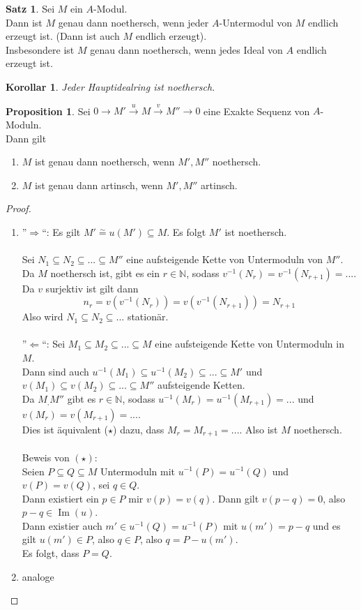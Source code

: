 \documentclass[10pt,a4paper]{article}
\newcommand{\N}{\ensuremath{\mathbb{N}}}
\newcommand{\Img}{\ensuremath{\operatorname{Im}}}
\newcommand{\isomorph}{\ensuremath{\overset{\sim}{=}}}
\newcounter{thm}[section]
\theoremstyle{definition}
\newtheorem{satz}[thm]{Satz}
\newtheorem{prop}[thm]{Proposition}
\theoremstyle{plain}
\newtheorem{kor}[thm]{Korollar}
\theoremstyle{remark}
\begin{document}
\begin{satz}
	Sei $M$ ein $A$-Modul.\\
	Dann ist $M$ genau dann noethersch, wenn jeder $A$-Untermodul von $M$ endlich erzeugt ist. (Dann ist auch $M$ endlich erzeugt).\\
	Insbesondere ist $M$ genau dann noethersch, wenn jedes Ideal von $A$ endlich erzeugt ist.
\end{satz}
\begin{kor}
	Jeder Hauptidealring ist noethersch.
\end{kor}
\begin{prop}
	\label{506Prop}
	Sei $0\rightarrow M'\xrightarrow{u}M\xrightarrow{v}M''\rightarrow 0$ eine Exakte Sequenz von $A$-Moduln.\\
	Dann gilt
	\begin{enumerate}
		\item $M$ ist genau dann noethersch, wenn $M',M''$ noethersch.
		\item $M$ ist genau dann artinsch, wenn $M',M''$ artinsch.
	\end{enumerate}
\end{prop}
\begin{proof}
	\begin{enumerate}
		\item ''$\Rightarrow$``:
			Es gilt $M'\isomorph u(M')\subseteq M$. Es folgt $M'$ ist noethersch.\\
			\\
			Sei $N_1\subseteq N_2\subseteq ...\subseteq M''$ eine aufsteigende Kette von Untermoduln von $M''$. Da $M$ noethersch ist, gibt es ein $r\in\N$, sodass $v^{-1}(N_r)=v^{-1}(N_{r+1})=...$.\\
			Da $v$ surjektiv ist gilt dann
			\[n_r=v(v^{-1}(N_r))=v(v^{-1}(N_{r+1}))=N_{r+1}\]
			Also wird $N_1\subseteq N_2\subseteq...$ stationär.\\
			\\
		''$\Leftarrow$``: 
			Sei $M_1\subseteq M_2\subseteq...\subseteq M$ eine aufsteigende Kette von Untermoduln in $M$.\\
			Dann sind auch $u^{-1}(M_1)\subseteq u^{-1}(M_2)\subseteq...\subseteq M'$ und $v(M_1)\subseteq v(M_2)\subseteq...\subseteq M''$ aufsteigende Ketten.\\
			Da $M_,M''$ gibt es $r\in\N$, sodass $u^{-1}(M_r)=u^{-1}(M_{r+1})=...$ und $v(M_r)=v(M_{r+1})=...$.\\
			Dies ist äquivalent ($\star$) dazu, dass $M_r=M_{r+1}=...$. Also ist $M$ noethersch.\\
			\\
		Beweis von $(\star)$:\\
		Seien $P\subseteq Q\subseteq M$ Untermoduln mit $u^{-1}(P)=u^{-1}(Q)$ und $v(P)=v(Q)$, sei $q\in Q$.\\
		Dann existiert ein $p\in P$ mir $v(p)=v(q)$. Dann gilt $v(p-q)=0$, also $p-q\in\Img(u)$.\\
		Dann existier auch $m'\in u^{-1}(Q)=u^{-1}(P)$ mit $u(m')=p-q$ und es gilt $u(m')\in P$, also $q\in P$, also $q=P-u(m')$.\\
		Es folgt, dass $P=Q$.
		\item analoge
	\end{enumerate}
\end{proof}
\end{document}
